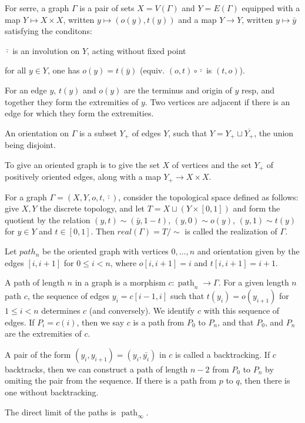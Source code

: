 \documentclass{article}
\begin{document}
For serre, a graph $\Gamma$ is a pair of sets $X=V(\Gamma)$ and $Y=E(\Gamma)$ equipped with a map $Y\mapsto X\times X$, written $y \mapsto (o(y),t(y))$ and a map $Y\to Y$, written $y\mapsto \bar{y}$ satisfying the conditons:
\begin{enumerate*}
    \item $\bar{\cdot}$ is an involution on $Y$, acting without fixed point
    \item for all $y\in Y$, one has $o(y) = t(\bar{y})$ (equiv. $(o,t)\circ \bar{\cdot}$ is $(t,o)$).
\end{enumerate*}
For an edge $y$, $t(y)$ and $o(y)$ are the terminus and origin of $y$ resp, and together they form the extremities of $y$. Two vertices are adjacent if there is an edge for which they form the extremities.

An orientation on $\Gamma$ is a subset $Y_+$ of edges $Y$, such that $Y=Y_+\sqcup \overline{Y_+}$, the union being disjoint.

To give an oriented graph is to give the set $X$ of vertices and the set $Y_+$ of positively oriented edges, along with a map $Y_+ \to X\times X$.

For a graph $\Gamma = (X,Y,o,t,\bar{\cdot})$, consider the topological space defined as follows: give $X,Y$ the discrete topology, and let $T= X\sqcup (Y\times [0,1])$ and form the quotient by the relation $(y,t)\sim (\bar{y}, 1-t)$, $(y,0)\sim o(y)$, $(y,1)\sim t(y)$ for $y\in Y$ and $t\in [0,1]$. Then $real(\Gamma)= T/\sim$ is called the realization of $\Gamma$.

\newcommand{\path}{\operatorname{path}}
Let $path_n$ be the oriented graph with vertices $0,\dots,n$ and orientation given by the edges $[i,i+1]$ for $0\leq i <n$, where $o[i,i+1]=i$ and $t[i,i+1]=i+1$.

A path of length $n$ in a graph is a morphism $c:\path_n\to \Gamma$. For a given length $n$ path $c$, the sequence of edges  $y_i=c[i-1,i]$ such that $t(y_i)=o(y_{i+1})$ for $1\leq i <n$ determines $c$ (and conversely). We identify $c$ with this sequence of edges. If $P_i=c(i)$, then we say $c$ is a path from $P_0$ to $P_n$, and that $P_0$, and $P_n$ are the extremities of $c$.

A pair of the form  $(y_i,y_{i+1})=(y_i,\bar{y_i})$ in $c$ is called a backtracking. If $c$ backtracks, then we can construct a path of length $n-2$ from $P_0$ to $P_n$ by omiting the pair from the sequence. If there is a path from $p$ to $q$, then there is one without backtracking.

The direct limit of the paths is $\path_\infty$.
\end{document}
